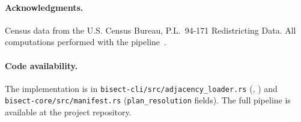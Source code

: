 \paragraph{Acknowledgments.}
Census data from the U.S. Census Bureau, P.L.\ 94-171 Redistricting Data.
All computations performed with the \bisect{} pipeline~\citep{dellaLibera2026b1}.

\paragraph{Code availability.}
The implementation is in \texttt{bisect-cli/src/adjacency\_loader.rs}
(\derive{}, \buildc{}) and \texttt{bisect-core/src/manifest.rs}
(\texttt{plan\_resolution} fields).
The full pipeline is available at the project repository.
